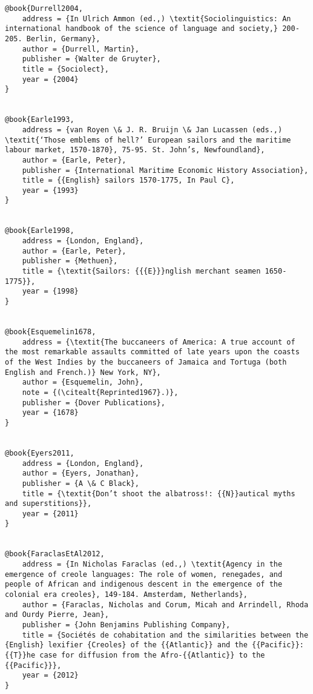 \begin{verbatim}
@book{Durrell2004,
	address = {In Ulrich Ammon (ed.,) \textit{Sociolinguistics: An international handbook of the science of language and society,} 200-205. Berlin, Germany},
	author = {Durrell, Martin},
	publisher = {Walter de Gruyter},
	title = {Sociolect},
	year = {2004}
}


@book{Earle1993,
	address = {van Royen \& J. R. Bruijn \& Jan Lucassen (eds.,) \textit{‘Those emblems of hell?’ European sailors and the maritime labour market, 1570-1870}, 75-95. St. John’s, Newfoundland},
	author = {Earle, Peter},
	publisher = {International Maritime Economic History Association},
	title = {{English} sailors 1570-1775, In Paul C},
	year = {1993}
}


@book{Earle1998,
	address = {London, England},
	author = {Earle, Peter},
	publisher = {Methuen},
	title = {\textit{Sailors: {{{E}}}nglish merchant seamen 1650-1775}},
	year = {1998}
}


@book{Esquemelin1678,
	address = {\textit{The buccaneers of America: A true account of the most remarkable assaults committed of late years upon the coasts of the West Indies by the buccaneers of Jamaica and Tortuga (both English and French.)} New York, NY},
	author = {Esquemelin, John},
	note = {(\citealt{Reprinted1967}.)},
	publisher = {Dover Publications},
	year = {1678}
}


@book{Eyers2011,
	address = {London, England},
	author = {Eyers, Jonathan},
	publisher = {A \& C Black},
	title = {\textit{Don’t shoot the albatross!: {{N}}autical myths and superstitions}},
	year = {2011}
}


@book{FaraclasEtAl2012,
	address = {In Nicholas Faraclas (ed.,) \textit{Agency in the emergence of creole languages: The role of women, renegades, and people of African and indigenous descent in the emergence of the colonial era creoles}, 149-184. Amsterdam, Netherlands},
	author = {Faraclas, Nicholas and Corum, Micah and Arrindell, Rhoda and Ourdy Pierre, Jean},
	publisher = {John Benjamins Publishing Company},
	title = {Sociétés de cohabitation and the similarities between the {English} lexifier {Creoles} of the {{Atlantic}} and the {{Pacific}}: {{T}}he case for diffusion from the Afro-{{Atlantic}} to the {{Pacific}}},
	year = {2012}
}



\end{verbatim}
